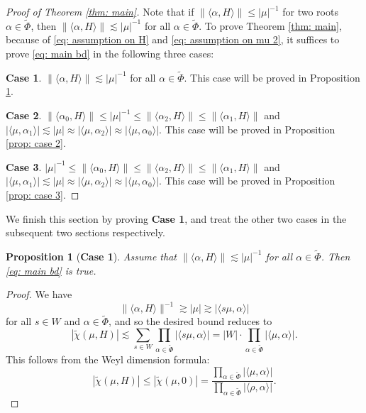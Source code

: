 \documentclass{amsart}
\numberwithin{equation}{section}
\newtheorem{prop}[thm]{Proposition}
\numberwithin{equation}{section}
\begin{document}
\begin{proof}[Proof of Theorem \ref{thm: main}]
Note that if $\|\langle\alpha,H\rangle\|\leq |\mu|^{-1}$ for two roots $\alpha\in \widetilde{\Phi}$, then $\|\langle\alpha,H\rangle\|\lesssim |\mu|^{-1}$ for all $\alpha\in\widetilde{\Phi}$.  To prove Theorem \ref{thm: main}, because of \eqref{eq: assumption on H} and \eqref{eq: assumption on mu 2}, it suffices to prove \eqref{eq: main bd} in the following three cases:

\noindent \textbf{Case 1}.  $\|\langle\alpha, H\rangle\|\lesssim |\mu|^{-1}$ for all $\alpha\in\widetilde{\Phi}$. 
This case will be proved in Proposition \ref{prop: case 1}. 

\noindent\textbf{Case 2}. 
$\|\langle\alpha_0, H\rangle\|\leq|\mu|^{-1}\leq  \|\langle\alpha_2, H\rangle\|\leq \|\langle\alpha_1, H\rangle\|$ and $| \langle\mu,\alpha_1\rangle|\lesssim |\mu|\approx |\langle\mu,\alpha_2\rangle|\approx |\langle\mu,\alpha_0\rangle|$.
This case will be proved in Proposition \ref{prop: case 2}. 

\noindent\textbf{Case 3}.  
$|\mu|^{-1}\leq \|\langle\alpha_0,H\rangle\|\leq \|\langle\alpha_2,H\rangle\|\leq \|\langle\alpha_1,H\rangle\|$ and $| \langle\mu,\alpha_1\rangle|\lesssim |\mu|\approx |\langle\mu,\alpha_2\rangle|\approx |\langle\mu,\alpha_0\rangle|$. 
This case will be proved in Proposition \ref{prop: case 3}. 
\end{proof}



We finish this section by proving \textbf{Case 1}, and treat the other two cases in the subsequent two sections respectively. 

\begin{prop}[\textbf{Case 1}]\label{prop: case 1}
    Assume that $\|\langle\alpha, H\rangle\|\lesssim |\mu|^{-1}$ for all $\alpha\in\widetilde{\Phi}$. Then \eqref{eq: main bd} is true. 
\end{prop}
\begin{proof}
    We have $$\|\langle\alpha, H\rangle\|^{-1}\gtrsim |\mu|\gtrsim|\langle s\mu,\alpha\rangle|$$ for all $s\in W$ and $\alpha\in\widetilde{\Phi}$, and so the desired bound reduces to 
$$|\widetilde{\chi}(\mu, H)|\lesssim \sum_{s\in W}\prod_{\alpha\in\widetilde{\Phi}}|\langle s\mu,\alpha\rangle|=|W|\cdot \prod_{\alpha\in\widetilde{\Phi}}|\langle \mu,\alpha\rangle|.$$
This follows from the Weyl dimension formula:
$$|\widetilde{\chi}(\mu,H)|\leq |\widetilde{\chi}(\mu,0)|=\frac{\prod_{\alpha\in\widetilde{\Phi}}|\langle\mu,\alpha\rangle|}{\prod_{\alpha\in\widetilde{\Phi}}|\langle\rho,\alpha\rangle|}.$$
\end{proof}
\end{document}
